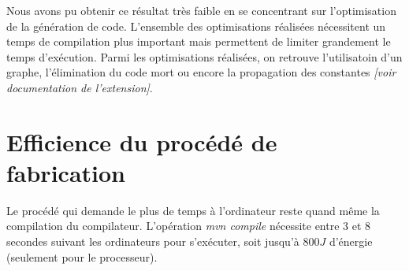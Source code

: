 \documentclass[12pt]{article}
\begin{document}
	Nous avons pu obtenir ce résultat très faible en se concentrant sur l'optimisation de la génération de code. L'ensemble des optimisations réalisées nécessitent un temps de compilation plus important mais permettent de limiter grandement le temps d'exécution. Parmi les optimisations réalisées, on retrouve l'utilisatoin d'un graphe, l'élimination du code mort ou encore la propagation des constantes \textit{[voir documentation de l'extension]}.

\section{Efficience du procédé de fabrication}
	Le procédé qui demande le plus de temps à l'ordinateur reste quand même la compilation du compilateur. L'opération \textit{mvn compile} nécessite entre 3 et 8 secondes suivant les ordinateurs pour s'exécuter, soit jusqu'à $800 J$ d'énergie (seulement pour le processeur).
	
\end{document}

